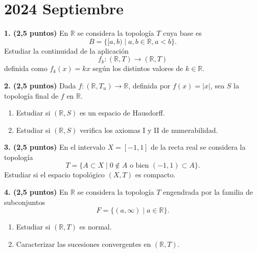 \clearpage
\chapter*{2024 Septiembre}

\begin{enunciado}
    \hypertarget{2024 S 1}{}
    \textbf{1. (2,5 puntos)} En \(\mathbb{R}\) se considera la topología \(T\) cuya base es
    \[
        B = \{[a,b) \mid a,b \in \mathbb{R}, a < b\}.
    \]
    Estudiar la continuidad de la aplicación
    \[
        f_k : (\mathbb{R}, T) \to (\mathbb{R}, T)
    \]
    definida como \(f_k(x) = kx\) según los distintos valores de \(k \in \mathbb{R}\).
\end{enunciado}

\begin{enunciado}
    \hypertarget{2024 S 2}{}
    \textbf{2. (2,5 puntos)} Dada \(f : (\mathbb{R}, T_u) \to \mathbb{R}\), definida por \(f(x) = |x|\), sea \(S\) la topología final de \(f\) en \(\mathbb{R}\).
    \begin{enumerate}[label=\alph*)]
        \item Estudiar si \((\mathbb{R}, S)\) es un espacio de Hausdorff.
        \item Estudiar si \((\mathbb{R}, S)\) verifica los axiomas I y II de numerabilidad.
    \end{enumerate}
\end{enunciado}

\begin{enunciado}
    \hypertarget{2024 S 3}{}
    \textbf{3. (2,5 puntos)} En el intervalo \(X = [-1, 1]\) de la recta real se considera la topología
    \[
        T = \{A \subset X \mid 0 \notin A \text{ o bien } (-1, 1) \subset A\}.
    \]
    Estudiar si el espacio topológico \((X, T)\) es compacto.
\end{enunciado}

\begin{enunciado}
    \hypertarget{2024 S 4}{}
    \textbf{4. (2,5 puntos)} En \(\mathbb{R}\) se considera la topología \(T\) engendrada por la familia de subconjuntos
    \[
        F = \{(a, \infty) \mid a \in \mathbb{R}\}.
    \]
    \begin{enumerate}[label=\alph*)]
        \item Estudiar si \((\mathbb{R}, T)\) es normal.
        \item Caracterizar las sucesiones convergentes en \((\mathbb{R}, T)\).
    \end{enumerate}
\end{enunciado}